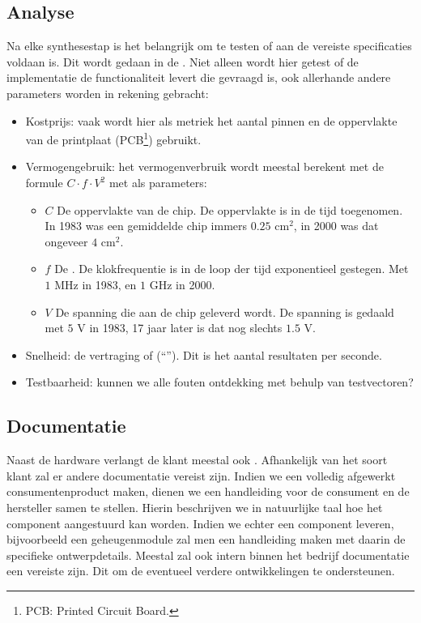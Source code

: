 \subsection{Analyse}
\label{ss:analyse}
Na elke synthesestap is het belangrijk om te testen of aan de vereiste specificaties voldaan is. Dit wordt gedaan in de . Niet alleen wordt hier getest of de implementatie de functionaliteit levert die gevraagd is, ook allerhande andere parameters worden in rekening gebracht:
\begin{itemize}
 \item Kostprijs: vaak wordt hier als metriek het aantal pinnen en de oppervlakte van de printplaat (PCB\footnote{PCB: Printed Circuit Board.}) gebruikt.
 \item Vermogengebruik: het vermogenverbruik wordt meestal berekent met de formule $C\cdot f\cdot V^2$ met als parameters:
 \begin{itemize}
  \item $C$ De oppervlakte van de chip. De oppervlakte is in de tijd toegenomen. In 1983 was een gemiddelde chip immers $0.25\mbox{ cm}^2$, in 2000 was dat ongeveer $4\mbox{ cm}^2$.
  \item $f$ De . De klokfrequentie is in de loop der tijd exponentieel gestegen. Met $1\mbox{ MHz}$ in 1983, en $1\mbox{ GHz}$ in 2000.
  \item $V$ De spanning die aan de chip geleverd wordt. De spanning is gedaald met $5\mbox{ V}$ in 1983, 17 jaar later 	is dat nog slechts $1.5\mbox{ V}$.
 \end{itemize}
 \item Snelheid: de vertraging of  (``''). Dit is het aantal resultaten per seconde.
 \item Testbaarheid: kunnen we alle fouten ontdekking met behulp van testvectoren?
\end{itemize}
\subsection{Documentatie}
\label{ss:documentatie}
Naast de hardware verlangt de klant meestal ook . Afhankelijk van het soort klant zal er andere documentatie vereist zijn. Indien we een volledig afgewerkt consumentenproduct maken, dienen we een handleiding voor de consument en de hersteller samen te stellen. Hierin beschrijven we in natuurlijke taal hoe het component aangestuurd kan worden. Indien we echter een component leveren, bijvoorbeeld een geheugenmodule zal men een handleiding maken met daarin de specifieke ontwerpdetails. Meestal zal ook intern binnen het bedrijf documentatie een vereiste zijn. Dit om de eventueel verdere ontwikkelingen te ondersteunen.
